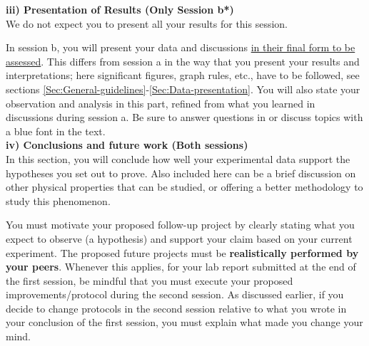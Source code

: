 \documentclass[12pt]{report}
\begin{document}
\noindent \textbf{iii) Presentation of Results (Only Session b*)}\\
 We do not expect you to present all your results for this session.

In session b, you will present your data and discussions \underline{in their final form to be assessed}. This differs from session a in the way that you present your results and interpretations; here significant figures, graph rules, etc., have to be followed, see sections \ref{Sec:General-guidelines}-\ref{Sec:Data-presentation}. 
You will also state your observation and analysis in this part, refined from what you learned in discussions during session a. {\color{blue} Be sure to answer questions in or discuss topics with a blue font in the text.} \\

\noindent \textbf{iv) Conclusions and future work (Both sessions) }\\
\noindent In this section, you will conclude how well your experimental data support the hypotheses you set out to prove. Also included here can be a brief discussion on other physical properties that can be studied, or offering a better methodology to study this phenomenon.

You must motivate your proposed follow-up project by clearly stating what you expect to observe (a hypothesis) and support your claim based on your current experiment. The proposed future projects must be \textbf{realistically performed by your peers}. Whenever this applies, for your lab report submitted at the end of the first session, be mindful that you must execute your proposed improvements/protocol during the second session.
As discussed earlier, if you decide to change protocols in the second session relative to what you wrote in your conclusion of the first session, you must explain what made you change your mind.
\end{document}
